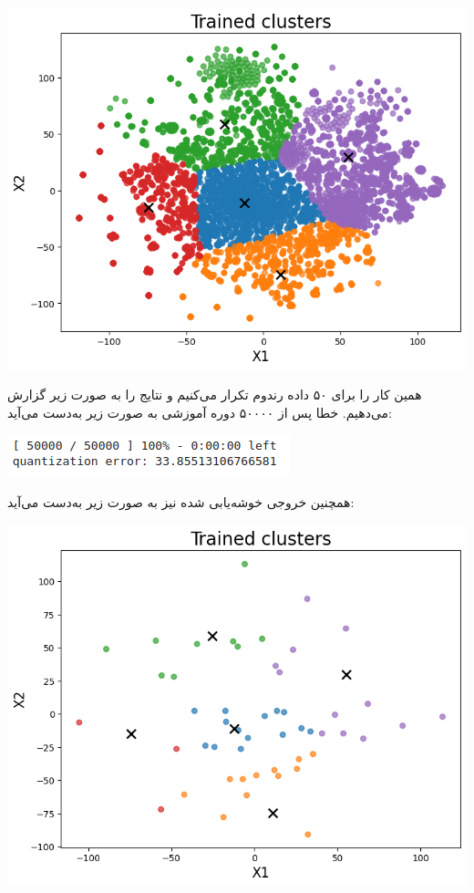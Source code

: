 \begin{enumerate}
\begin{qsolve}
		\begin{center}
			\includegraphics*[width=0.6\linewidth]{pics/img18.png}
			\label{داده‌های خوشه‌بندی شده پس از آموزش}
		\end{center}
		
		همین کار را برای ۵۰ داده رندوم تکرار می‌کنیم و نتایج را به صورت زیر گزارش می‌دهیم. خطا پس از ۵۰۰۰۰ دوره آموزشی به صورت زیر به‌دست می‌آید:
		
		\begin{center}
			\includegraphics*[width=0.6\linewidth]{pics/img19.png}
			\label{خطای شبکه برای داده‌های رندوم}
		\end{center}
		
		همچنین خروجی خوشه‌یابی شده نیز به صورت زیر به‌دست می‌آيد:
		
		\begin{center}
			\includegraphics*[width=0.6\linewidth]{pics/img20.png}
			\label{داده‌های خوشه‌بندی شده پس از آموزش برای داده‌های رندوم}
		\end{center}
		

\end{qsolve}
\end{enumerate}
